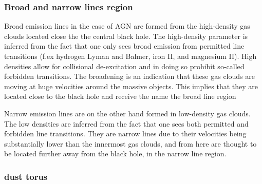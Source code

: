 \documentclass{article}
\begin{document}




\subsubsection{Broad and narrow lines region}

Broad emission lines in the case of AGN are formed from the high-density gas clouds located close the the central black hole. The 
high-density parameter is inferred from the fact that one only sees broad emission from permitted line transitions (f.ex hydrogen Lyman and Balmer,
iron II, and magnesium II). High densities allow for collisional de-excitation and in doing so prohibit so-called forbidden transitions.
The broadening is an indication that these gas clouds are moving at huge velocities around the massive objects. This implies that they are located close to the black hole and receive the name the broad line region

Narrow emission lines are on the other hand formed in low-density gas clouds. The low densities are inferred from the fact that one sees
both permitted and forbidden line transitions. They are narrow lines due to their velocities being substantially lower than the innermost gas clouds, and from here are thought to be located further away from the black hole, in the narrow line region. 


\subsubsection{dust torus}
\end{document}
